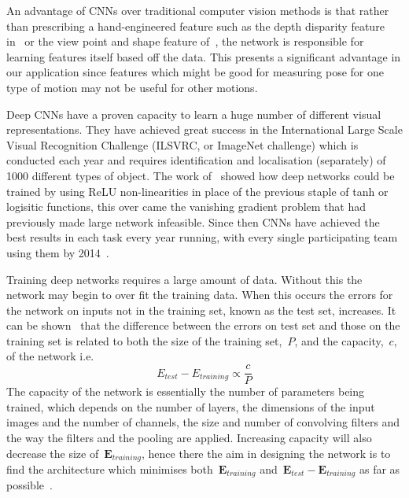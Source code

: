 \documentclass[11pt]{article} %
\begin{document}
An advantage of CNNs over traditional computer vision methods is that rather than prescribing a hand-engineered feature such as the depth disparity feature in~\cite{Blake2011} or the view point and shape feature of~\cite{Chan2014}, the network is responsible for learning features itself based off the data. This presents a significant advantage in our application since features which might be good for measuring pose for one type of motion may not be useful for other motions. %

Deep CNNs have a proven capacity to learn a huge number of different visual representations. They have achieved great success in the International Large Scale Visual Recognition Challenge (ILSVRC, or ImageNet challenge) which is conducted each year and requires identification and localisation (separately) of 1000 different types of object. The work of~\cite{Krizhevsky2012} showed how deep networks could be trained by using ReLU non-linearities in place of the previous staple of tanh or logisitic functions, this over came the vanishing gradient problem that had previously made large network infeasible. Since then CNNs have achieved the best results in each task every year running, with every single participating team using them by 2014~\cite{Russakovsky}.

Training deep networks requires a large amount of data. Without this the network may begin to over fit the training data. When this occurs the errors for the network on inputs not in the training set, known as the test set, increases. It can be shown~\cite{Seung1992,Vapnik1994} that the difference between the errors on test set and those on the training set is related to both the size of the training set,~$P$, and the capacity,~$c$,  of the network i.e. 
\begin{equation}
E_{test}-E_{training} \propto \frac{c}{P}
\label{eq:errorCap}
\end{equation}
The capacity of the network is essentially the number of parameters being trained, which depends on the number of layers, the dimensions of the input images and the number of channels, the size and number of convolving filters and the way the filters and the pooling are applied. Increasing capacity will also decrease the size of~$\boldsymbol{E}_{training}$, hence there the aim in designing the network is to find the architecture which minimises both~$\boldsymbol{E}_{training}$ and~$\boldsymbol{E}_{test}-\boldsymbol{E}_{training}$ as far as possible~\cite{LeCun1998}.
\end{document}
